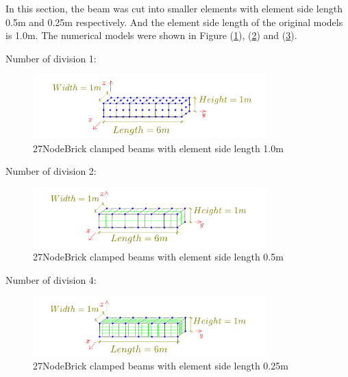 \documentclass[fleqn,11pt,letter]{article}
\begin{document}
\newpage
In this section, the beam was cut into smaller elements with element side length 0.5m and 0.25m respectively. And the element side length of the original models is 1.0m. The numerical models were shown in Figure (\ref{fig 27NodeBrick clamped beams with element side length 1.0m}), (\ref{fig 27NodeBrick clamped beams with element side length 0.5m}) and (\ref{fig 27NodeBrick clamped beams with element side length 0.25m}). 

Number of division 1:

\begin{figure}[H]
  \centering
  \includegraphics[width=9cm]{../Figure_files/27NodeBrick/beam_27brick.pdf}
  \caption{27NodeBrick clamped beams with element side length 1.0m}
  \label{fig 27NodeBrick clamped beams with element side length 1.0m}
\end{figure}

Number of division 2:

\begin{figure}[H]
  \centering
  \includegraphics[width=9cm]{../Figure_files/27NodeBrick/beam_8brick_more_2.pdf}
  \caption{27NodeBrick clamped beams with element side length 0.5m}
  \label{fig 27NodeBrick clamped beams with element side length 0.5m}
\end{figure}

Number of division 4:

\begin{figure}[H]
  \centering
  \includegraphics[width=9cm]{../Figure_files/27NodeBrick/beam_8brick_more.pdf}
  \caption{27NodeBrick clamped beams with element side length 0.25m}
  \label{fig 27NodeBrick clamped beams with element side length 0.25m}
\end{figure}
\end{document}
